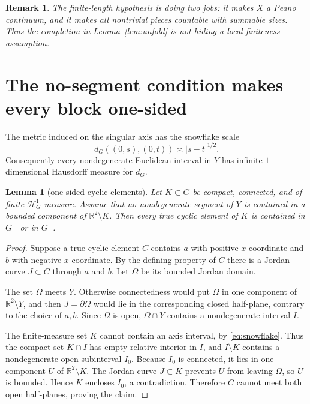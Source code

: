 \documentclass[11pt]{article}
\newtheorem{lemma}[theorem]{Lemma}
\newtheorem{remark}[theorem]{Remark}
\newcommand{\R}{\mathbb R}
\newcommand{\Hh}{\mathcal H}
\begin{document}
\begin{remark}\label{rem:why-finite}
The finite-length hypothesis is doing two jobs: it makes $X$ a Peano
continuum, and it makes all nontrivial pieces countable with summable sizes.
Thus the completion in Lemma~\ref{lem:unfold} is not hiding a local-finiteness
assumption.
\end{remark}

\section{The no-segment condition makes every block one-sided}

The metric induced on the singular axis has the snowflake scale
\begin{equation}\label{eq:snowflake}
 d_G((0,s),(0,t))\asymp |s-t|^{1/2}.
\end{equation}
Consequently every nondegenerate Euclidean interval in $Y$ has infinite
$1$-dimensional Hausdorff measure for $d_G$.

\begin{lemma}[one-sided cyclic elements]\label{lem:onesided}
Let $K\subset G$ be compact, connected, and of finite $\Hh^1_G$-measure.
Assume that no nondegenerate segment of $Y$ is contained in a bounded
component of $\R^2\setminus K$.  Then every true cyclic element of $K$ is
contained in $G_+$ or in $G_-$.
\end{lemma}

\begin{proof}
Suppose a true cyclic element $C$ contains $a$ with positive $x$-coordinate
and $b$ with negative $x$-coordinate.  By the defining property of $C$ there
is a Jordan curve $J\subset C$ through $a$ and $b$.  Let $\Omega$ be its
bounded Jordan domain.

The set $\Omega$ meets $Y$.  Otherwise connectedness would put $\Omega$ in
one component of $\R^2\setminus Y$, and then
$J=\partial\Omega$ would lie in the corresponding closed half-plane,
contrary to the choice of $a,b$.  Since $\Omega$ is open,
$\Omega\cap Y$ contains a nondegenerate interval $I$.

The finite-measure set $K$ cannot contain an axis interval, by
\eqref{eq:snowflake}.  Thus the compact set $K\cap I$ has empty relative
interior in $I$, and $I\setminus K$ contains a nondegenerate open
subinterval $I_0$.  Because $I_0$ is connected, it lies in one component
$U$ of $\R^2\setminus K$.  The Jordan curve $J\subset K$ prevents $U$ from
leaving $\Omega$, so $U$ is bounded.  Hence $K$ encloses $I_0$, a
contradiction.  Therefore $C$ cannot meet both open half-planes, proving the
claim.
\end{proof}
\end{document}
